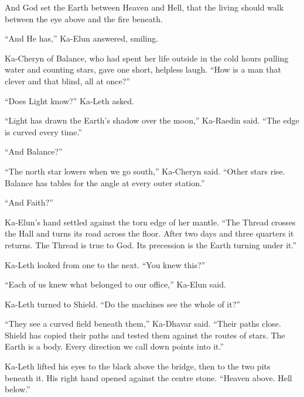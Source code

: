 \begin{scripture}
And God set the Earth between Heaven and Hell, that the living should walk between the eye above and the fire beneath.
\end{scripture}

``And He has,'' Ka-Elun answered, smiling.\par

Ka-Cheryn of Balance, who had spent her life outside in the cold hours pulling water and counting stars, gave one short, helpless laugh. ``How is a man that clever and that blind, all at once?''\par

``Does Light know?'' Ka-Leth asked.\par

``Light has drawn the Earth's shadow over the moon,'' Ka-Raedin said. ``The edge is curved every time.''\par

``And Balance?''\par

``The north star lowers when we go south,'' Ka-Cheryn said. ``Other stars rise. Balance has tables for the angle at every outer station.''\par

``And Faith?''\par

Ka-Elun's hand settled against the torn edge of her mantle. ``The Thread crosses the Hall and turns its road across the floor. After two days and three quarters it returns. The Thread is true to God. Its precession is the Earth turning under it.''\par

Ka-Leth looked from one to the next. ``You knew this?''\par

``Each of us knew what belonged to our office,'' Ka-Elun said.\par

Ka-Leth turned to Shield. ``Do the machines see the whole of it?''\par

``They see a curved field beneath them,'' Ka-Dhavar said. ``Their paths close. Shield has copied their paths and tested them against the routes of stars. The Earth is a body. Every direction we call down points into it.''\par

Ka-Leth lifted his eyes to the black above the bridge, then to the two pits beneath it. His right hand opened against the centre stone. ``Heaven above. Hell below.''\par

